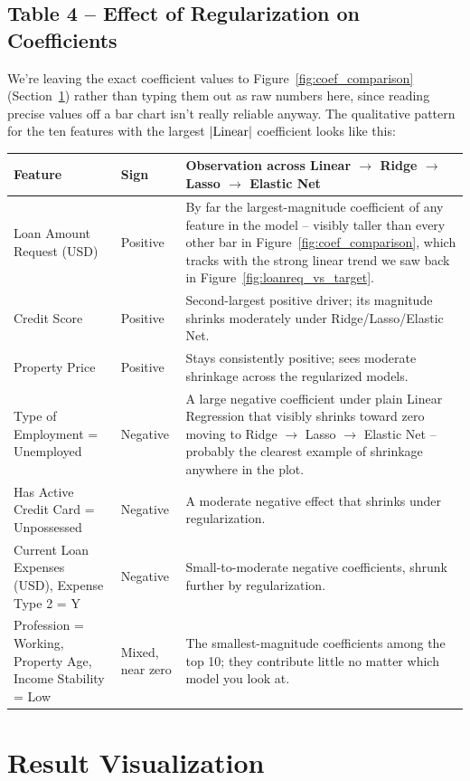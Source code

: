 \documentclass[12pt,a4paper]{article}
\begin{document}
\subsection*{Table 4 -- Effect of Regularization on Coefficients}
We're leaving the exact coefficient values to Figure~\ref{fig:coef_comparison} (Section~\ref{sec:visualization}) rather than typing them out as raw numbers here, since reading precise values off a bar chart isn't really reliable anyway. The qualitative pattern for the ten features with the largest $|{\rm Linear}|$ coefficient looks like this:

\begin{longtable}{|p{4.3cm}|p{2cm}|p{7cm}|}
\hline
\textbf{Feature} & \textbf{Sign} & \textbf{Observation across Linear $\to$ Ridge $\to$ Lasso $\to$ Elastic Net} \\ \hline
Loan Amount Request (USD) & Positive & By far the largest-magnitude coefficient of any feature in the model -- visibly taller than every other bar in Figure~\ref{fig:coef_comparison}, which tracks with the strong linear trend we saw back in Figure~\ref{fig:loanreq_vs_target}. \\ \hline
Credit Score & Positive & Second-largest positive driver; its magnitude shrinks moderately under Ridge/Lasso/Elastic Net. \\ \hline
Property Price & Positive & Stays consistently positive; sees moderate shrinkage across the regularized models. \\ \hline
Type of Employment = Unemployed & Negative & A large negative coefficient under plain Linear Regression that visibly shrinks toward zero moving to Ridge $\to$ Lasso $\to$ Elastic Net -- probably the clearest example of shrinkage anywhere in the plot. \\ \hline
Has Active Credit Card = Unpossessed & Negative & A moderate negative effect that shrinks under regularization. \\ \hline
Current Loan Expenses (USD), Expense Type 2 = Y & Negative & Small-to-moderate negative coefficients, shrunk further by regularization. \\ \hline
Profession = Working, Property Age, Income Stability = Low & Mixed, near zero & The smallest-magnitude coefficients among the top 10; they contribute little no matter which model you look at. \\ \hline
\end{longtable}

\section{Result Visualization}\label{sec:visualization}
\end{document}
